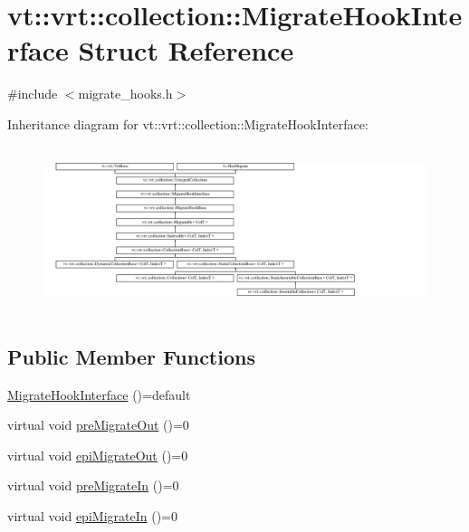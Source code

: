 \hypertarget{structvt_1_1vrt_1_1collection_1_1_migrate_hook_interface}{}\section{vt\+:\+:vrt\+:\+:collection\+:\+:Migrate\+Hook\+Interface Struct Reference}
\label{structvt_1_1vrt_1_1collection_1_1_migrate_hook_interface}


{\ttfamily \#include $<$migrate\+\_\+hooks.\+h$>$}

Inheritance diagram for vt\+:\+:vrt\+:\+:collection\+:\+:Migrate\+Hook\+Interface\+:\begin{figure}[H]
\begin{center}
\leavevmode
\includegraphics[height=4.873803cm]{structvt_1_1vrt_1_1collection_1_1_migrate_hook_interface}
\end{center}
\end{figure}
\subsection*{Public Member Functions}
\begin{DoxyCompactItemize}
\item 
\hyperlink{structvt_1_1vrt_1_1collection_1_1_migrate_hook_interface_a7fcec6d6a05c806ba91d418ee4dd6910}{Migrate\+Hook\+Interface} ()=default
\item 
virtual void \hyperlink{structvt_1_1vrt_1_1collection_1_1_migrate_hook_interface_a62bb547d9fb604428bc48bf324e3bc14}{pre\+Migrate\+Out} ()=0
\item 
virtual void \hyperlink{structvt_1_1vrt_1_1collection_1_1_migrate_hook_interface_ac1f0d90fec0c3b0f9df2f5379b53e15f}{epi\+Migrate\+Out} ()=0
\item 
virtual void \hyperlink{structvt_1_1vrt_1_1collection_1_1_migrate_hook_interface_a7bd07b1d69bc1cce87da2ce06231f382}{pre\+Migrate\+In} ()=0
\item 
virtual void \hyperlink{structvt_1_1vrt_1_1collection_1_1_migrate_hook_interface_ab62eb6ac33ae44f73d6b6e5977d0f81e}{epi\+Migrate\+In} ()=0
\end{DoxyCompactItemize}
